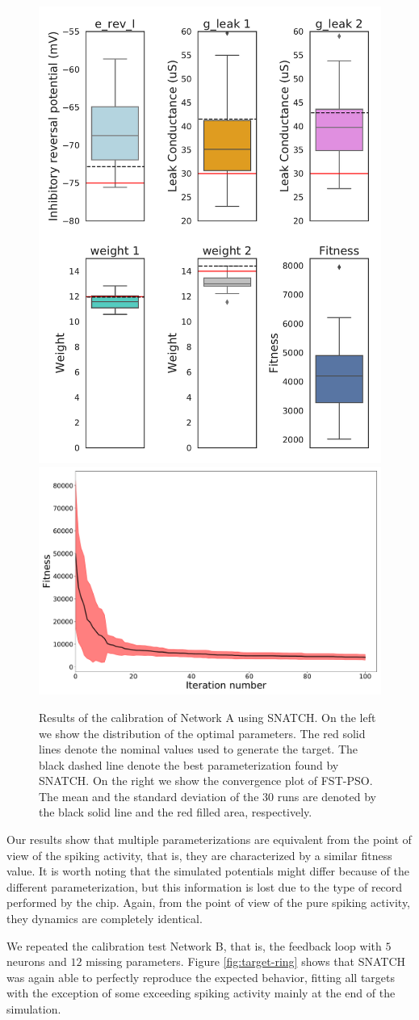 \documentclass[utf8]{frontiersFPHY} %
\newcommand {\name}{SNATCH}
\begin{document}
\begin{figure}[!ht]
	\centering
	\includegraphics[width=.25\textwidth]{images/2-neurons-irregular/boxplot_best_values-test.pdf}
	\includegraphics[width=.49\textwidth]{images/2-neurons-irregular/mean.pdf}
	\caption{Results of the calibration of Network A using \name{}. On the left we show the distribution of the optimal parameters. The red solid lines denote the nominal values used to generate the target. The black dashed line denote the best parameterization found by \name{}. On the right we show the convergence plot of FST-PSO. The mean and the standard deviation of the $30$ runs are denoted by the black solid line and the red filled area, respectively.}
	\label{fig:boxplots-2neurons}
\end{figure}

Our results show that multiple parameterizations
are equivalent from the point of view of the spiking activity, that is, they are characterized by a similar fitness value.
It is worth noting that the simulated potentials
might differ because of the different parameterization, but this information is lost due to the type of record performed by the chip. 
Again, from the point of view of the pure spiking activity, they
dynamics are  completely identical.

We repeated the calibration test Network B, that is, the feedback loop with $5$ neurons and $12$ missing parameters. 
Figure \ref{fig:target-ring} shows that \name{} was again able to perfectly reproduce the expected behavior, fitting all targets with the exception of some exceeding spiking activity mainly at the end of the simulation.
\end{document}
